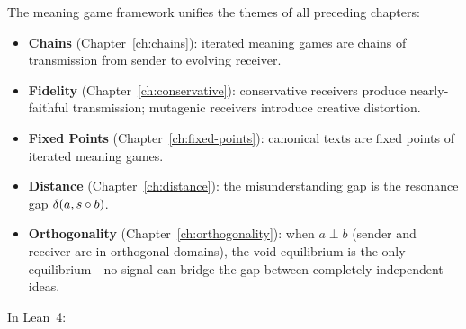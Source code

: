 The meaning game framework unifies the themes of all preceding chapters:
\begin{itemize}
\item \textbf{Chains} (Chapter~\ref{ch:chains}): iterated meaning games are
  chains of transmission from sender to evolving receiver.
\item \textbf{Fidelity} (Chapter~\ref{ch:conservative}): conservative receivers
  produce nearly-faithful transmission; mutagenic receivers introduce creative
  distortion.
\item \textbf{Fixed Points} (Chapter~\ref{ch:fixed-points}): canonical texts
  are fixed points of iterated meaning games.
\item \textbf{Distance} (Chapter~\ref{ch:distance}): the misunderstanding gap
  is the resonance gap $\delta(a, s \circ b)$.
\item \textbf{Orthogonality} (Chapter~\ref{ch:orthogonality}): when $a \perp b$
  (sender and receiver are in orthogonal domains), the void equilibrium is
  the only equilibrium---no signal can bridge the gap between completely
  independent ideas.
\end{itemize}

In Lean~4:

